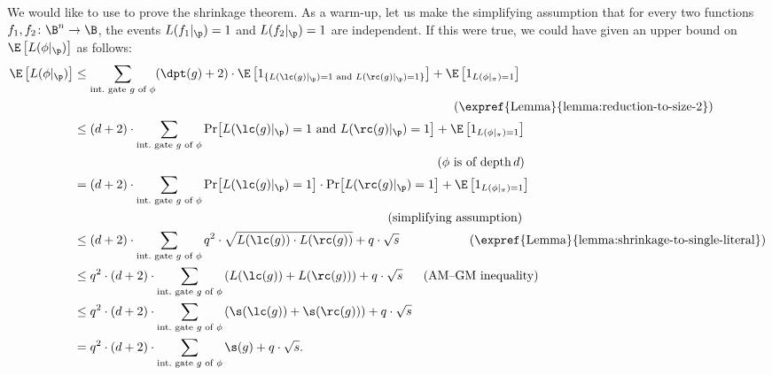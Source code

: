 \documentclass{toc}
\begin{document}
We would like to use 
to prove the shrinkage theorem. As a warm-up, let us make the simplifying
assumption that for every two functions $f_{1},f_{2}\colon\B^{n}\to\B$,
the events $L(f_{1}|_{\p})=1$ and $L(f_{2}|_{\p})=1$ are independent.
If this were true, we could have
%
given an upper bound on %
$\E\left[L(\phi|_{\p})\right]$
as follows: 
%
%
%
%
%
%
%
%
%
%
%
%
\begin{align*}
\E\left[L(\phi|_{\p})\right] & \le\sum_{\text{int.\ gate \ensuremath{g} of \ensuremath{\phi}}}(\dpt(g)+2)\cdot\E\left[1_{\left\{ L(\lc(g)|_{\p})=1\text{ and }L(\rc(g)|_{\p})=1\right\} }\right] 
 +\E\left[1_{L(\phi|_{\pi})=1}\right]\\
 & \qquad\qquad\qquad\qquad\qquad\qquad\qquad\qquad\qquad
   \qquad\qquad\qquad\qquad\qquad\qquad\ \
\text{(\expref{Lemma}{lemma:reduction-to-size-2})}\\        %
 & \le(d+2)\cdot\sum_{\text{int.\ gate \ensuremath{g} of \ensuremath{\phi}}}\Pr\!\left[L(\lc(g)|_{\p})=1\text{ and }L(\rc(g)|_{\p})=1\right] 
 +\E\left[1_{L(\phi|_{\pi})=1}\right]\\
 & \qquad\qquad\qquad\qquad\qquad\qquad\qquad\qquad\qquad
   \qquad\qquad\qquad\qquad\qquad\quad\ 
\text{(\ensuremath{\phi} is of depth\,\ensuremath{d})}\\ %
 & =(d+2)\cdot\sum_{\text{int.\ gate \ensuremath{g} of \ensuremath{\phi}}}\Pr\!\left[L(\lc(g)|_{\p})=1\right]\cdot\Pr\!\left[L(\rc(g)|_{\p})=1\right] 
  +\E\left[1_{L(\phi|_{\pi})=1}\right]\\
& \qquad\qquad\qquad\qquad\qquad\qquad\qquad\qquad\qquad
  \qquad\qquad\qquad\quad\ 
\text{(simplifying assumption)}\\          %
  & \le(d+2)\cdot\sum_{\text{int.\ gate \ensuremath{g} of \ensuremath{\phi}}}q^{2}\cdot\sqrt{L(\lc(g))\cdot L(\rc(g))}+q\cdot\sqrt{s}
\qquad\qquad\quad\ \
  \text{(\expref{Lemma}{lemma:shrinkage-to-single-literal})}\\  %
& \le q^{2}\cdot(d+2)\cdot\sum_{\text{int.\ gate \ensuremath{g} of \ensuremath{\phi}}}\left(L(\lc(g))+L(\rc(g))\right)+q\cdot\sqrt{s}
  \quad\ \    \text{(AM--GM inequality)}\\              %
%
 & \le q^{2}\cdot(d+2)\cdot\sum_{\text{int.\ gate \ensuremath{g} of \ensuremath{\phi}}}\left(\s(\lc(g))+\s(\rc(g))\right)+q\cdot\sqrt{s}\\
 & =q^{2}\cdot(d+2)\cdot\sum_{\text{int.\ gate \ensuremath{g} of \ensuremath{\phi}}}\s(g)+q\cdot\sqrt{s}.
\end{align*}  
\end{document}
